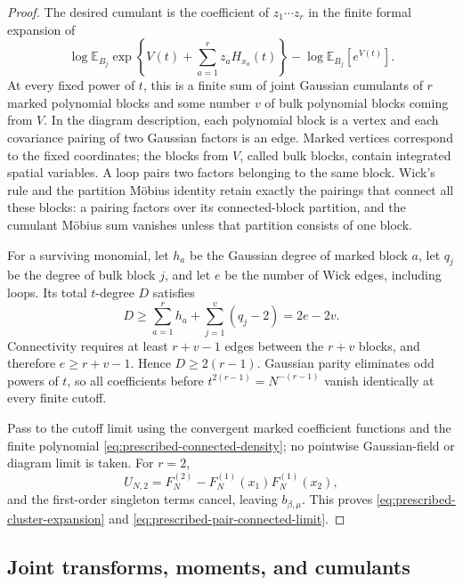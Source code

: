 \documentclass[11pt,reqno]{amsart}
\numberwithin{equation}{section}
\theoremstyle{plain}
\theoremstyle{definition}
\newcommand{\E}{\mathbb E}
\newcommand{\be}{\beta}
\begin{document}
\begin{proof}
The desired cumulant is the coefficient of $z_1\cdots z_r$ in the finite formal expansion of
\begin{equation}
 \log\E_{B_j}\exp\left\{V(t)+\sum_{a=1}^rz_aH_{x_a}(t)\right\}
 -\log\E_{B_j}[e^{V(t)}].
 \label{eq:prescribed-cluster-formal-cumulant}
\end{equation}
At every fixed power of $t$, this is a finite sum of joint Gaussian cumulants of $r$ marked polynomial blocks and some number $v$ of bulk polynomial blocks coming from $V$. In the diagram description, each polynomial block is a vertex and each covariance pairing of two Gaussian factors is an edge. Marked vertices correspond to the fixed coordinates; the blocks from $V$, called bulk blocks, contain integrated spatial variables. A loop pairs two factors belonging to the same block.  Wick's rule and the partition M\"obius identity retain exactly the pairings that connect all these blocks: a pairing factors over its connected-block partition, and the cumulant M\"obius sum vanishes unless that partition consists of one block.

For a surviving monomial, let $h_a$ be the Gaussian degree of marked block $a$, let $q_j$ be the degree of bulk block $j$, and let $e$ be the number of Wick edges, including loops.  Its total $t$-degree $D$ satisfies
\begin{equation}
 D\geq\sum_{a=1}^rh_a+\sum_{j=1}^v(q_j-2)=2e-2v.
 \label{eq:prescribed-cluster-degree-count}
\end{equation}
Connectivity requires at least $r+v-1$ edges between the $r+v$ blocks, and therefore $e\geq r+v-1$.  Hence $D\geq2(r-1)$.  Gaussian parity eliminates odd powers of $t$, so all coefficients before $t^{2(r-1)}=N^{-(r-1)}$ vanish identically at every finite cutoff.

Pass to the cutoff limit using the convergent marked coefficient functions and the finite polynomial \eqref{eq:prescribed-connected-density}; no pointwise Gaussian-field or diagram limit is taken.  For $r=2$,
\begin{equation}
 U_{N,2}=F_N^{(2)}-F_N^{(1)}(x_1)F_N^{(1)}(x_2),
 \label{eq:prescribed-pair-connected-formula}
\end{equation}
and the first-order singleton terms cancel, leaving $b_{\be,\mu}$.  This proves \eqref{eq:prescribed-cluster-expansion} and \eqref{eq:prescribed-pair-connected-limit}.
\end{proof}

\subsection{Joint transforms, moments, and cumulants}
\label{subsec:prescribed-linear-statistic-expansions}
\end{document}
